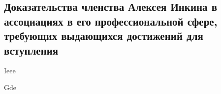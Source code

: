 \subsection{%
    Доказательства членства Алексея Инкина в ассоциациях в его профессиональной сфере,
    требующих выдающихся достижений для вступления%
}
\label{subsec:Associations}

{Ieee}

\pagebreak

{Gde}

\pagebreak
